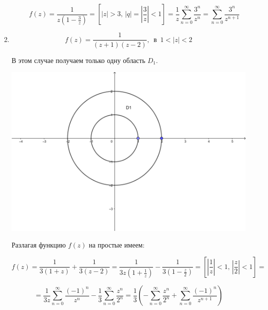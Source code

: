 \documentclass[../../main.tex]{subfiles}
\begin{document}
\begin{exmp}
\begin{enumerate}
\begin{enumerate}
			\[ f(z) = \frac{1}{z(1 - \frac{3}{z})} = \left[ |z| > 3,\, |q| = 
			|\frac{3}{z}| < 1 \right] = \frac{1}{z} \sum\limits_{n = 0}^{\infty} 
			\frac{3^n}{z^n} = \sum\limits_{n = 0}^{\infty} \frac{3^n}{z^{n + 1}} \]
		\end{enumerate}
	
		\item \[ f(z) = \frac{1}{(z + 1)(z - 2)},\, \text{ в }\, 1 < |z| < 2 \]
		
		В этом случае получаем только одну область $ D_1 $.
		
		\begin{center}
			\includegraphics[scale = 0.8]{lec34_2} 
		\end{center}
	
		Разлагая функцию $ f(z) $ на простые имеем:
		
		\[ f(z) = \frac{1}{3(1 + z)} + \frac{1}{3(z - 2)} = \frac{1}{3z(1 + 
		\frac{1}{z})} - \frac{1}{3(1 - \frac{z}{2})} = \left[ |\frac{1}{z}| < 1,\, 
		|\frac{z}{2}| < 1 \right] = \]
		
		\[ = \frac{1}{3z} \sum\limits_{n = 0}^{\infty} \frac{(-1)^n}{z^n} - 
		\frac{1}{3} \sum\limits_{n = 0}^{\infty} \frac{z^n}{2^n} = \frac{1}{3} 
		\left( -\sum\limits_{n = 0}^{\infty} \frac{z^n}{2^n} + \sum\limits_{n = 
		0}^{\infty} \frac{(-1)^n}{z^{n + 1}} \right) \]
	\end{enumerate}
\end{exmp}
\end{document}
